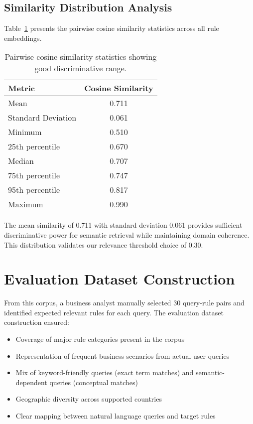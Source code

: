 \subsection{Similarity Distribution Analysis}

Table~\ref{tab:similarity-stats} presents the pairwise cosine similarity statistics across all rule embeddings.

\begin{table}[H]
\centering
\begin{tabular}{lc}
\toprule
\textbf{Metric} & \textbf{Cosine Similarity} \\
\midrule
Mean & 0.711 \\
Standard Deviation & 0.061 \\
Minimum & 0.510 \\
25th percentile & 0.670 \\
Median & 0.707 \\
75th percentile & 0.747 \\
95th percentile & 0.817 \\
Maximum & 0.990 \\
\bottomrule
\end{tabular}
\caption{Pairwise cosine similarity statistics showing good discriminative range.}
\label{tab:similarity-stats}
\end{table}

The mean similarity of 0.711 with standard deviation 0.061 provides sufficient discriminative power for semantic retrieval while maintaining domain coherence. This distribution validates our relevance threshold choice of 0.30.

\section{Evaluation Dataset Construction}

From this corpus, a business analyst manually selected 30 query-rule pairs and identified expected relevant rules for each query. The evaluation dataset construction ensured:
\begin{itemize}[leftmargin=*,itemsep=2pt,topsep=2pt]
 \item Coverage of major rule categories present in the corpus
 \item Representation of frequent business scenarios from actual user queries
 \item Mix of keyword-friendly queries (exact term matches) and semantic-dependent queries (conceptual matches)
 \item Geographic diversity across supported countries
 \item Clear mapping between natural language queries and target rules
\end{itemize}

